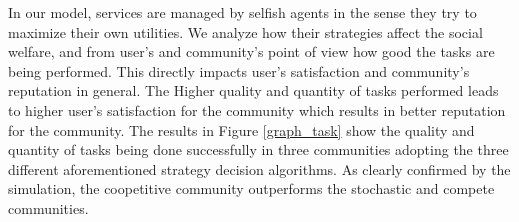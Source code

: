 

In our model, services are managed by selfish agents in the sense
they try to maximize their own utilities. We analyze how their
strategies affect the social welfare, and from user's and
community's point of view how good the tasks are being performed.
This directly impacts user's satisfaction and community's
reputation in general. The Higher quality and quantity of tasks
performed leads to higher user's satisfaction for the community
which results in better reputation for the community. The results
in Figure \ref{graph_task} show the quality and quantity of tasks
being done successfully in three communities adopting the three
different aforementioned strategy decision algorithms. As clearly confirmed by the simulation, the coopetitive community
outperforms the stochastic and compete communities.

